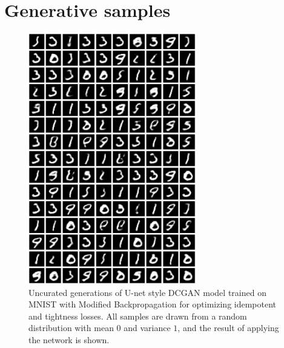 \documentclass{article}
\theoremstyle{plain}
\theoremstyle{definition}
\theoremstyle{remark}
\begin{document}
\newpage
\section{Generative samples}
\label{app:gen-samples}
\begin{figure}[H]
    \centering
    \includegraphics[width=0.65\textwidth]{./resources/modified_0-1_0-1_rand_samples.png}
    \caption{Uncurated generations of U-net style DCGAN model trained on MNIST with Modified Backpropagation for optimizing idempotent and tightness losses. All samples are drawn from a random distribution with mean $0$ and variance $1$, and the result of applying the network is shown.}
    \label{fig:big-gen-mnist}
\end{figure}

\newpage
\end{document}
